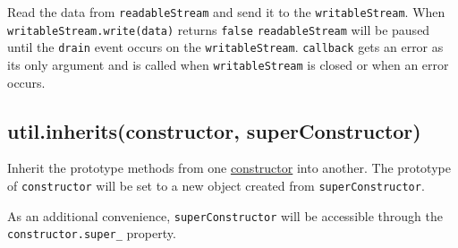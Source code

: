 Read the data from \texttt{readableStream} and send it to the
\texttt{writableStream}. When \texttt{writableStream.write(data)}
returns \texttt{false} \texttt{readableStream} will be paused until the
\texttt{drain} event occurs on the \texttt{writableStream}.
\texttt{callback} gets an error as its only argument and is called when
\texttt{writableStream} is closed or when an error occurs.

\subsection{util.inherits(constructor, superConstructor)}

Inherit the prototype methods from one
\href{https://developer.mozilla.org/en/JavaScript/Reference/Global\_Objects/Object/constructor}{constructor}
into another. The prototype of \texttt{constructor} will be set to a new
object created from \texttt{superConstructor}.

As an additional convenience, \texttt{superConstructor} will be
accessible through the \texttt{constructor.super\_} property.

\begin{Shaded}
\begin{Highlighting}[]
 \NormalTok{);}
 \NormalTok{);}

 
    \NormalTok{(}\NormalTok{);}
\NormalTok{\}}

\NormalTok{);}

 \NormalTok{= }
    \NormalTok{(}
\NormalTok{\}}

  

\NormalTok{); }
\NormalTok{(}\NormalTok{_ === }\NormalTok{); }

\NormalTok{(}\NormalTok{, }
    \NormalTok{(} \NormalTok{);}
\NormalTok{\})}
\NormalTok{(}\NormalTok{); }
\end{Highlighting}
\end{Shaded}

